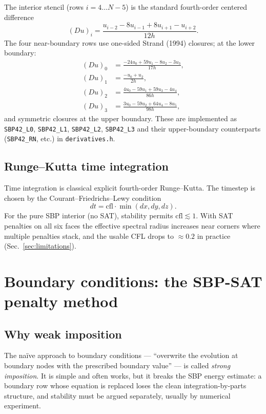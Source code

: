 \documentclass[11pt]{article}
\begin{document}
The interior stencil (rows $i = 4 \ldots N-5$) is the standard
fourth-order centered difference
\begin{equation}
  (D u)_i = \frac{u_{i-2} - 8 u_{i-1} + 8 u_{i+1} - u_{i+2}}{12 h}.
\end{equation}
The four near-boundary rows use one-sided Strand (1994) closures;
at the lower boundary:
\begin{align*}
  (D u)_0 &= \frac{-24 u_0 + 59 u_1 - 8 u_2 - 3 u_3}{17 h}, \\
  (D u)_1 &= \frac{-u_0 + u_2}{2 h}, \\
  (D u)_2 &= \frac{ 4 u_0 - 59 u_1 + 59 u_3 - 4 u_4}{86 h}, \\
  (D u)_3 &= \frac{ 3 u_0 - 59 u_2 + 64 u_4 - 8 u_5}{98 h},
\end{align*}
and symmetric closures at the upper boundary. These are implemented as
\texttt{SBP42\_L0}, \texttt{SBP42\_L1}, \texttt{SBP42\_L2},
\texttt{SBP42\_L3} and their upper-boundary counterparts
(\texttt{SBP42\_RN}, etc.) in \texttt{derivatives.h}.

\subsection{Runge--Kutta time integration}

Time integration is classical explicit fourth-order Runge--Kutta. The
timestep is chosen by the Courant--Friedrichs--Lewy condition
\begin{equation}
  dt = \mathrm{cfl} \cdot \min(dx, dy, dz).
\end{equation}
For the pure SBP interior (no SAT), stability permits $\mathrm{cfl}
\lesssim 1$. With SAT penalties on all six faces the effective
spectral radius increases near corners where multiple penalties
stack, and the usable CFL drops to $\approx 0.2$ in practice
(Sec.~\ref{sec:limitations}).

\section{Boundary conditions: the SBP-SAT penalty method}
\label{sec:sat}

\subsection{Why weak imposition}

The na\"ive approach to boundary conditions — ``overwrite the evolution
at boundary nodes with the prescribed boundary value'' — is called
\emph{strong imposition}. It is simple and often works, but it breaks
the SBP energy estimate: a boundary row whose equation is replaced
loses the clean integration-by-parts structure, and stability must be
argued separately, usually by numerical experiment.
\end{document}
